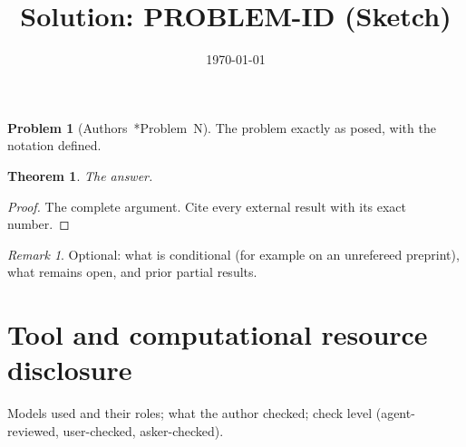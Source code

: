 \documentclass[11pt]{amsart}
\theoremstyle{plain}
\newtheorem{theorem}{Theorem}
\theoremstyle{definition}
\newtheorem{problem}{Problem}
\theoremstyle{remark}
\newtheorem{remark}{Remark}
\begin{document}
\title{Solution: PROBLEM-ID (Sketch)}
\date{\today}
\maketitle

\begin{problem}[{Authors~\cite{SRC}*{Problem~N}}]
The problem exactly as posed, with the notation defined.
\end{problem}

\begin{theorem}
The answer.
\end{theorem}

\begin{proof}
The complete argument. Cite every external result with its exact number.
\end{proof}

\begin{remark}
Optional: what is conditional (for example on an unrefereed preprint), what
remains open, and prior partial results.
\end{remark}

\section*{Tool and computational resource disclosure}
Models used and their roles; what the author checked; check level
(agent-reviewed, user-checked, asker-checked).

\begin{bibdiv}
\begin{biblist}
\end{biblist}
\end{bibdiv}
\end{document}
